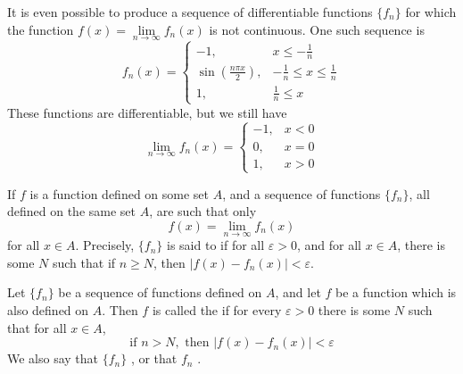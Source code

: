 \documentclass[12pt, a4paper, oneside, openright, titlepage]{book}
\begin{document}
\begin{eg}
    It is even possible to produce a sequence of differentiable functions $\{f_n\}$ for which the function $f(x) = \lim\limits_{n\rightarrow \infty}f_n(x)$ is not continuous. One such sequence is \begin{equation*}
        f_n(x) = \left\{\begin{array}{lc} -1, &  x \leq -\frac{1}{n} \\ \sin\left(\frac{n\pi x}{2}\right), & -\frac{1}{n} \leq x \leq \frac{1}{n} \\ 1, & \frac{1}{n} \leq x \end{array}\right.
    \end{equation*}
    These functions are differentiable, but we still have  \begin{equation*}
        \lim\limits_{n\rightarrow \infty}f_n(x) = \left\{\begin{array}{lc} -1, & x < 0 \\ 0, & x = 0 \\ 1, & x > 0 \end{array}\right.
    \end{equation*}
\end{eg}

\begin{defn}
    If $f$ is a function defined on some set $A$, and a sequence of functions $\{f_n\}$, all defined on the same set $A$, are such that only \begin{equation*}
        f(x) = \lim\limits_{n\rightarrow \infty}f_n(x)
    \end{equation*}
    for all $x \in A$. Precisely, $\{f_n\}$ is said to  if for all $\varepsilon > 0$, and for all $x \in A$, there is some $N$ such that if $n \geq N$, then $|f(x) - f_n(x)| < \varepsilon$.
\end{defn}


\begin{defn}
    Let $\{f_n\}$ be a sequence of functions defined on $A$, and let $f$ be a function which is also defined on $A$. Then $f$ is called the  if for every $\varepsilon > 0$ there is some $N$ such that for all $x \in A$, \begin{equation*}
        \text{if } n> N, \text{ then } |f(x) - f_n(x)| < \varepsilon
    \end{equation*}
    We also say that $\{f_n\}$ , or that $f_n$ .
\end{defn}
\end{document}
